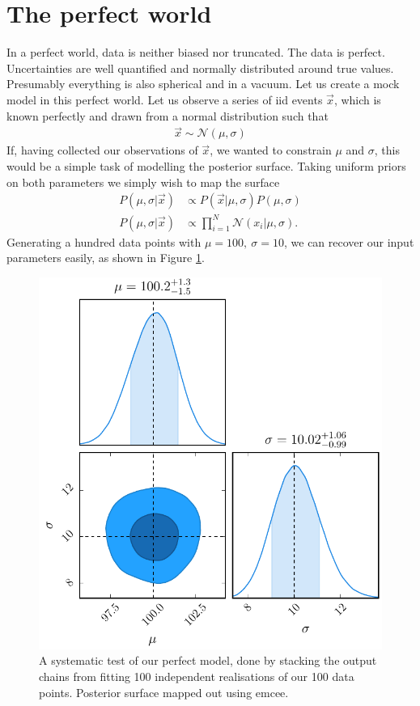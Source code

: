 \documentclass[a4paper,fleqn,usenatbib]{mnras}
\begin{document}
\section{The perfect world}
\label{sec:perfect}
In a perfect world, data is neither biased nor truncated. The data is perfect. Uncertainties are well quantified and normally distributed around true values. Presumably everything is also spherical and in a vacuum. Let us create a mock model in this perfect world. Let us observe a series of iid events $\vec{x}$, which is known perfectly and drawn from a normal distribution such that 
\begin{align}
\vec{x} \sim \mathcal{N}(\mu,\sigma)
\end{align}
If, having collected our observations of $\vec{x}$, we wanted to constrain $\mu$ and $\sigma$, this would be a simple task of modelling the posterior surface. Taking uniform priors on both parameters we simply wish to map the surface
\begin{align}
P(\mu,\sigma| \vec{x}) &\propto P(\vec{x} | \mu, \sigma) P(\mu, \sigma) \\
P(\mu,\sigma| \vec{x}) &\propto \prod_{i=1}^N \mathcal{N}(x_i | \mu, \sigma).
\end{align}
Generating a hundred data points with $\mu=100,\ \sigma=10$, we can recover our input parameters easily, as shown in Figure \ref{fig:perfect}.
\begin{figure}
	\begin{center}
		\includegraphics[width=\columnwidth]{example/perfect.pdf}
	\end{center}
	\caption{A systematic test of our perfect model, done by stacking the output chains from fitting 100 independent realisations of our 100 data points. Posterior surface mapped out using emcee.}
	\label{fig:perfect}
\end{figure}
\end{document}
